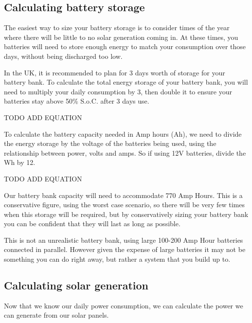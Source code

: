 \documentclass{article}
\theoremstyle{definition}
\theoremstyle{definition}
\theoremstyle{remark}
\begin{document}

  {\color{blue}\subsection{Calculating battery storage}} %
  \label{sub:calculating_battery_storage}

    The easiest way to size your battery storage is to consider times of the year where there will be little to no solar generation coming in. At these times, you batteries will need to store enough energy to match your consumption over those days, without being discharged too low.

    In the UK, it is recommended to plan for 3 days worth of storage for your battery bank. To calculate the total energy storage of your battery bank, you will need to multiply your daily consumption by 3, then double it to ensure your batteries stay above 50\% S.o.C. after 3 days use.

    TODO ADD EQUATION

    To calculate the battery capacity needed in Amp hours (Ah), we need to divide the energy storage by the voltage of the batteries being used, using the relationship between power, volts and amps. So if using 12V batteries, divide the Wh by 12.

    TODO ADD EQUATION

    Our battery bank capacity will need to accommodate 770 Amp Hours. This is a conservative figure, using the worst case scenario, so there will be very few times when this storage will be required, but by conservatively sizing your battery bank you can be confident that they will last as long as possible.

    This is not an unrealistic battery bank, using large 100-200 Amp Hour batteries connected in parallel. However given the expense of large batteries it may not be something you can do right away, but rather a system that you build up to.


  {\color{blue}\subsection{Calculating solar generation}} %
  \label{sub:calculating_solar_generation}

    Now that we know our daily power consumption, we can calculate the power we can generate from our solar panels.
\end{document}
